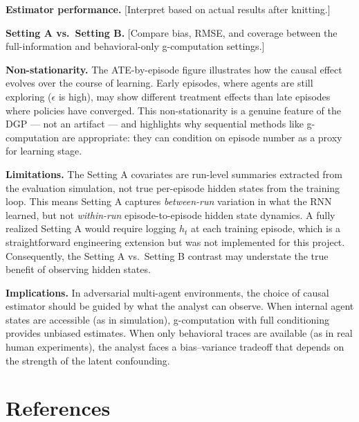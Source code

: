 \documentclass[
]{article}
\begin{document}
\textbf{Estimator performance.} {[}Interpret based on actual results
after knitting.{]}

\textbf{Setting A vs.~Setting B.} {[}Compare bias, RMSE, and coverage
between the full-information and behavioral-only g-computation
settings.{]}

\textbf{Non-stationarity.} The ATE-by-episode figure illustrates how the
causal effect evolves over the course of learning. Early episodes, where
agents are still exploring (\(\epsilon\) is high), may show different
treatment effects than late episodes where policies have converged. This
non-stationarity is a genuine feature of the DGP --- not an artifact ---
and highlights why sequential methods like g-computation are
appropriate: they can condition on episode number as a proxy for
learning stage.

\textbf{Limitations.} The Setting A covariates are run-level summaries
extracted from the evaluation simulation, not true per-episode hidden
states from the training loop. This means Setting A captures
\emph{between-run} variation in what the RNN learned, but not
\emph{within-run} episode-to-episode hidden state dynamics. A fully
realized Setting A would require logging \(h_t\) at each training
episode, which is a straightforward engineering extension but was not
implemented for this project. Consequently, the Setting A vs.~Setting B
contrast may understate the true benefit of observing hidden states.

\textbf{Implications.} In adversarial multi-agent environments, the
choice of causal estimator should be guided by what the analyst can
observe. When internal agent states are accessible (as in simulation),
g-computation with full conditioning provides unbiased estimates. When
only behavioral traces are available (as in real human experiments), the
analyst faces a bias--variance tradeoff that depends on the strength of
the latent confounding.

\section{References}\label{references}
\end{document}
